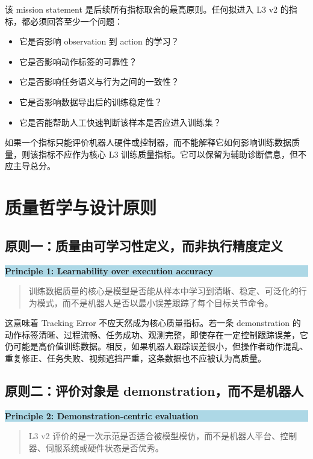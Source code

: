\documentclass[UTF8,zihao=-4,oneside,openany]{ctexrep}
\newenvironment{principlebox}[1]{\vspace{0.5em}\noindent\colorbox{LightBlue}{\parbox{0.96\linewidth}{\textbf{#1}}}\par\vspace{-0.2em}\begin{quote}\small}{\end{quote}\vspace{0.3em}}
\begin{document}
该 mission statement 是后续所有指标取舍的最高原则。任何拟进入 L3 v2 的指标，都必须回答至少一个问题：

\begin{itemize}
  \item 它是否影响 observation 到 action 的学习？
  \item 它是否影响动作标签的可靠性？
  \item 它是否影响任务语义与行为之间的一致性？
  \item 它是否影响数据导出后的训练稳定性？
  \item 它是否能帮助人工快速判断该样本是否应进入训练集？
\end{itemize}

如果一个指标只能评价机器人硬件或控制器，而不能解释它如何影响训练数据质量，则该指标不应作为核心 L3 训练质量指标。它可以保留为辅助诊断信息，但不应主导总分。

\section{质量哲学与设计原则}

\subsection{原则一：质量由可学习性定义，而非执行精度定义}

\begin{principlebox}{Principle 1: Learnability over execution accuracy}
训练数据质量的核心是模型是否能从样本中学习到清晰、稳定、可泛化的行为模式，而不是机器人是否以最小误差跟踪了每个目标关节命令。
\end{principlebox}

这意味着 Tracking Error 不应天然成为核心质量指标。若一条 demonstration 的动作标签清晰、过程流畅、任务成功、观测完整，即使存在一定控制跟踪误差，它仍可能是高价值训练数据。相反，如果机器人跟踪误差很小，但操作者动作混乱、重复修正、任务失败、视频遮挡严重，这条数据也不应被认为高质量。

\subsection{原则二：评价对象是 demonstration，而不是机器人}

\begin{principlebox}{Principle 2: Demonstration-centric evaluation}
L3 v2 评价的是一次示范是否适合被模型模仿，而不是机器人平台、控制器、伺服系统或硬件状态是否优秀。
\end{principlebox}
\end{document}
